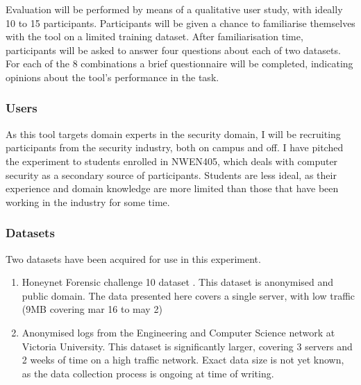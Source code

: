 Evaluation will be performed by means of a qualitative user study, with ideally 10 to 15 participants. 
Participants will be given a chance to familiarise themselves with the tool on a limited training dataset.
After familiarisation time, participants will be asked to answer four questions about each of two datasets.
For each of the 8 combinations a brief questionnaire will be completed, indicating opinions about the tool's performance in the task\cite{lewis1995ibm}. 
\subsubsection{Users}

As this tool targets domain experts in the security domain, I will be recruiting participants from the security industry, both on campus and off. I have pitched the experiment to students enrolled in NWEN405, which deals with computer security as a secondary source of participants. Students are less ideal, as their experience and domain knowledge are more limited than those that have been working in the industry for some time.

\subsubsection{Datasets}

Two datasets have been acquired for use in this experiment.
\begin{enumerate}
\item{Honeynet Forensic challenge 10 dataset \cite{forensic10}. This dataset is anonymised and public domain. The data presented here covers a single server, with low traffic (9MB covering mar 16 to may 2)}
\item{Anonymised logs from the Engineering and Computer Science network at Victoria University. This dataset is significantly larger, covering 3 servers and 2 weeks of time on a high traffic network. Exact data size is not yet known, as the data collection process is ongoing at time of writing.}
\end{enumerate}
